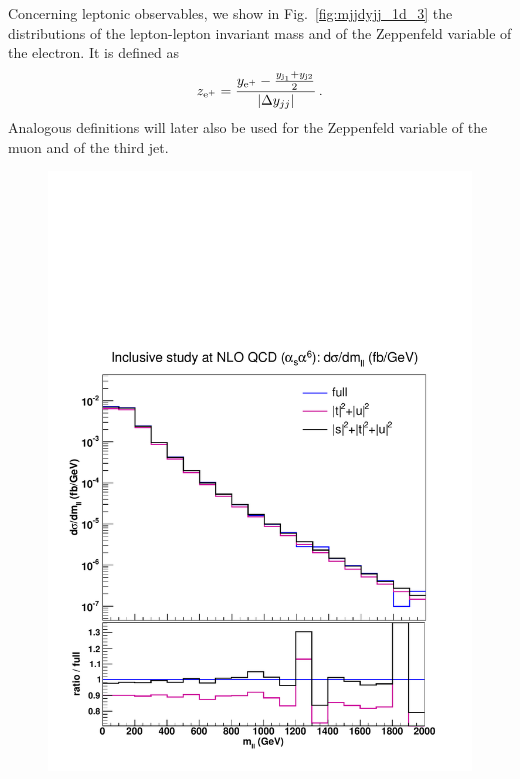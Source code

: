 Concerning leptonic observables, we show in Fig.~\ref{fig:mjjdyjj_1d_3} the distributions of the lepton-lepton invariant mass and of the Zeppenfeld variable of the electron. 
It is defined as
%
\begin{equation}
  z_{\text{e}^+} = \frac{y_{\text{e}^+}-\frac{y_{\text{j}_1}+y_{\text{j}2}}2}{|\Delta y_{jj}|} \,.
  \label{eq:Zeppenfeld}
\end{equation}
%
Analogous definitions will later also be used for the Zeppenfeld variable of the muon and of the third jet.
%
\begin{figure}[hbt]
\centering
{\includegraphics[scale=0.35]{figures/scanfigures/mll_nlo.pdf}}

\end{figure}
